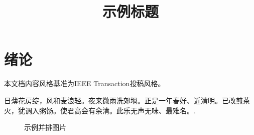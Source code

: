 \documentclass[12pt,journal,onecolumn]{IEEEtran}
\begin{document}
\title{\textbf{示例标题}}


{}
\maketitle

\patchcmd{\section}{\centering}{\raggedright}{}{} %
\patchcmd{\section}{\normalsize}{\large\bfseries}{}{} %

\section{绪论}

本文档内容风格基准为IEEE Transaction投稿风格。

日薄花房绽，风和麦浪轻。夜来微雨洗郊埛。正是一年春好、近清明。已改煎茶火，犹调入粥饧。使君高会有余清。此乐无声无味、最难名。\cite{populationref}.

\begin{figure}[!h]
	\centering
	\quad
	\quad
	\caption{示例并排图片}
	\label{tahitilocation}
\end{figure}
\end{document}
